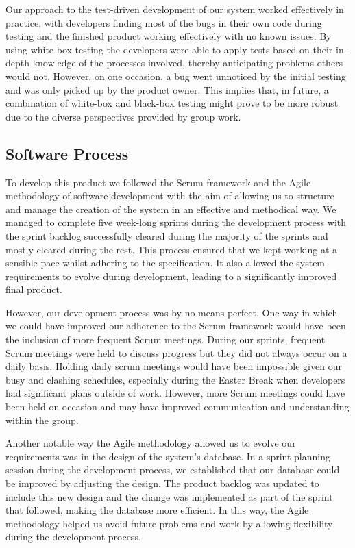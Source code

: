 \documentclass[11pt]{article}
\begin{document}
Our approach to the test-driven development of our system worked effectively in 
practice, with developers finding most of the bugs in their own code during 
testing and the finished product working effectively with no known issues. By 
using white-box testing the developers were able to apply tests based on their 
in-depth knowledge of the processes involved, thereby anticipating problems 
others would not. However, on one occasion, a bug went unnoticed by the initial 
testing and was only picked up by the product owner. This implies that, in 
future, a combination of white-box and black-box testing might prove to be more 
robust due to the diverse perspectives provided by group work.\par  

\subsection{Software Process}
To develop this product we followed the Scrum framework and the Agile 
methodology of software development with the aim of allowing us to structure 
and manage the creation of the system in an effective and methodical way. We 
managed to complete five week-long sprints during the development process with 
the sprint backlog successfully cleared during the majority of the sprints and 
mostly cleared during the rest.  This process ensured that we kept working at a sensible 
pace whilst adhering to the specification. It also 
allowed the system requirements to evolve during development, leading to a 
significantly improved final product.\par

However, our development process was by no means perfect. One way in which we 
could have improved our adherence to the Scrum framework 
would have been the inclusion of more frequent Scrum meetings. During our 
sprints, frequent Scrum meetings were held to discuss progress but they did 
not always occur on a daily basis. Holding daily scrum meetings would have 
been impossible given our busy and clashing schedules, especially during 
the Easter Break when developers had significant plans outside of work. 
However, more Scrum meetings could have been held on occasion and may have 
improved communication and understanding within the group.\par

Another notable way the Agile methodology allowed us to evolve our requirements 
was in the design of the system's database. In a sprint planning session 
during the development process, we established that our database 
could be improved by adjusting the design. The product 
backlog was updated to include this new design and the change was implemented 
as part of the sprint that followed, making the database more efficient. In 
this way, the Agile methodology helped us avoid future problems and work by 
allowing flexibility during the development process.\par
\end{document}
